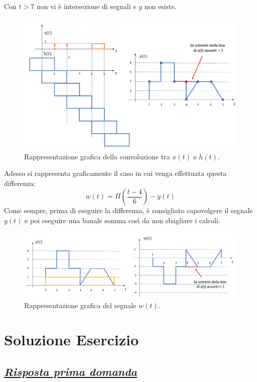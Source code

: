 \documentclass[a4paper]{article}
\begin{document}
	Con $t>7$ non vi è intersezione di segnali e $y$ non esiste.\newpage
	\begin{figure}[!htp]
		\centering
		\includegraphics[width=\textwidth]{img/fig_5.png}
		\caption*{Rappresentazione grafica della convoluzione tra $x\left(t\right)$ e $h\left(t\right)$.}
	\end{figure}
	
	\noindent
	Adesso si rappresenta graficamente il caso in cui venga effettuata questa differenza:
	\begin{equation*}
		w\left(t\right) = \Pi\left(\dfrac{t-4}{6}\right) - y\left(t\right)
	\end{equation*}
	Come sempre, prima di eseguire la differenza, è consigliato capovolgere il segnale $y\left(t\right)$ e poi eseguire una banale somma così da non sbagliare i calcoli.
	\begin{figure}[!htp]
		\centering
		\includegraphics[width=\textwidth]{img/fig_6.png}
		\caption*{Rappresentazione grafica del segnale $w\left(t\right)$.}
	\end{figure}\newpage

	\section{Soluzione Esercizio}
	
	\subsection*{\textcolor{Green4}{\emph{\underline{Risposta prima domanda}}}}
	
\end{document}
